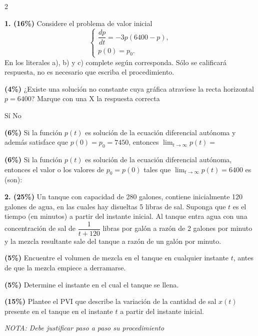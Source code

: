 \documentclass[11pt]{article}
\begin{document}
\begin{multicols}{2}

\textbf{1. (16\%)} Considere el problema de valor inicial
\[
\begin{cases}
\dfrac{dp}{dt}=-3p(6400-p), \\
p(0)=p_0.
\end{cases}
\]
En los literales a), b) y c) complete según corresponda. Sólo se calificará respuesta, no es necesario que escriba el procedimiento.

\begin{opciones}
\item[a)] \textbf{(4\%)} ¿Existe una solución no constante cuya gráfica atraviese la recta horizontal $p=6400$? Marque con una X la respuesta correcta

Sí\underline{\hspace{1cm}} No\underline{\hspace{1cm}}

\item[b)] \textbf{(6\%)} Si la función $p(t)$ es solución de la ecuación diferencial autónoma y además satisface que $p(0)=p_0=7450$, entonces $\displaystyle\lim_{t\to\infty}p(t)=$ \underline{\hspace{2cm}}

\item[c)] \textbf{(6\%)} Si la función $p(t)$ es solución de la ecuación diferencial autónoma, entonces el valor o los valores de $p_0= p(0)$ tales que $\displaystyle\lim_{t\to\infty}p(t)=6400$ es (son): \underline{\hspace{3cm}}
\end{opciones}

\columnbreak

\textbf{2. (25\%)} Un tanque con capacidad de 280 galones, contiene inicialmente 120 galones de agua, en las cuales hay disueltas 5 libras de sal. Suponga que $t$ es el tiempo (en minutos) a partir del instante inicial. Al tanque entra agua con una concentración de sal de $\dfrac{1}{t+120}$ libras por galón a razón de 2 galones por minuto y la mezcla resultante sale del tanque a razón de un galón por minuto.

\begin{opciones}
\item[a.] \textbf{(5\%)} Encuentre el volumen de mezcla en el tanque en cualquier instante $t$, antes de que la mezcla empiece a derramarse.
\item[b.] \textbf{(5\%)} Determine el instante en el cual el tanque se llena.
\item[c.] \textbf{(15\%)} Plantee el PVI que describe la variación de la cantidad de sal $x(t)$ presente en el tanque en el instante $t$ a partir del instante inicial.
\end{opciones}

\textit{NOTA: Debe justificar paso a paso su procedimiento}

\vspace{4cm}

\end{multicols}
\end{document}
